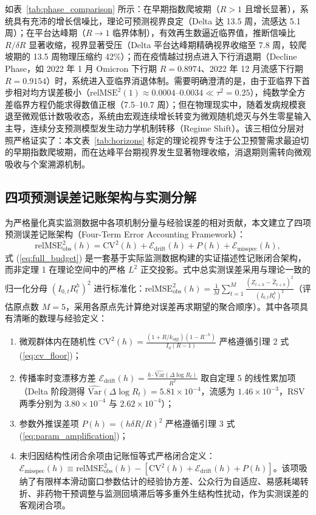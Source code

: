\documentclass[11pt,a4paper]{article}
\theoremstyle{plain}
\theoremstyle{definition}
\begin{document}
如表~\ref{tab:phase_comparison} 所示：在早期指数爬坡期（$R > 1$ 且增长显著），系统具有充沛的增长信噪比，理论可预测视界良定（Delta 达 13.5 周，流感达 5.1 周）；在平台达峰期（$R \to 1$ 临界体制），有效再生数逼近临界值，推断信噪比 $R/\delta R$ 显著收缩，视界显著受压（Delta 平台达峰期精确视界收缩至 7.8 周，较爬坡期的 13.5 周物理压缩约 42\%）；而在疫情越过拐点进入下行消退期（Decline Phase，如 2022 年 1 月 Omicron 下行期 $R=0.8974$、2022 年 12 月流感下行期 $R=0.9154$）时，系统进入亚临界消退体制。需要明确澄清的是，由于亚临界下首步相对均方误差极小（$\text{relMSE}^2(1) \approx 0.0004\text{--}0.0034 \ll \tau^2 = 0.25$），纯数学全方差临界方程仍能求得数值正根（7.5--10.7 周）；但在物理现实中，随着发病规模衰退至微观低计数吸收态，系统由宏观连续增长转变为微观随机熄灭与外生零星输入主导，连续分支预测模型发生动力学机制转移（Regime Shift）\citep{parag2026threshold}。该三相位分层对照严格证实了：本文表~\ref{tab:horizons} 标定的理论视界专注于公卫预警需求最迫切的早期指数爬坡期，而在达峰平台期视界发生显著物理收缩，消退期则需转向微观吸收与个案溯源机制。

\subsection{四项预测误差记账架构与实测分解}

为严格量化真实监测数据中各项机制分量与经验误差的相对贡献，本文建立了四项预测误差记账架构（Four-Term Error Accounting Framework）：
\begin{equation}
\text{relMSE}^2_{\text{obs}}(h) = \text{CV}^2(h) + \mathcal{E}_{\text{drift}}(h) + P(h) + \mathcal{E}_{\text{misspec}}(h),
\label{eq:full_budget}
\end{equation}
式 (\ref{eq:full_budget}) 是一套基于实际监测数据构建的实证描述性记账闭合架构，而非定理 1 在理论空间中的严格 $L^2$ 正交投影。式中总实测误差采用与理论一致的归一化分母 $(I_{0,t} R_t^h)^2$ 进行标准化：$\text{relMSE}^2_{\text{obs}}(h) = \frac{1}{M}\sum_{t=1}^M \frac{(Z_{t+h} - \hat{Z}_{t+h})^2}{(I_{0,t} R_t^h)^2}$（评估原点数 $M=5$，采用各原点先计算绝对误差再求期望的聚合顺序）。其中各项具有清晰的数理与经验定义：
\begin{enumerate}
\item 微观群体内在随机性 $\text{CV}^2(h) = \frac{(1+R/k_{\text{agg}})(1-R^{-h})}{I_0(R-1)}$ 严格遵循引理 2 式 (\ref{eq:cv_floor})；
\item 传播率时变漂移方差 $\mathcal{E}_{\text{drift}}(h) = \frac{h \cdot \widehat{\text{Var}}(\Delta \log R_t)}{R^2}$ 取自定理 5 的线性累加项（Delta 阶段测得 $\widehat{\text{Var}}(\Delta \log R_t) = 5.81 \times 10^{-4}$，流感为 $1.46 \times 10^{-3}$，RSV 两季分别为 $3.80 \times 10^{-4}$ 与 $2.62 \times 10^{-4}$）；
\item 参数外推误差项 $P(h) = (h \delta R / R)^2$ 严格遵循引理 3 式 (\ref{eq:param_amplification})；
\item 未归因结构性闭合余项由记账恒等式严格闭合定义：$\mathcal{E}_{\text{misspec}}(h) \equiv \text{relMSE}^2_{\text{obs}}(h) - [\text{CV}^2(h) + \mathcal{E}_{\text{drift}}(h) + P(h)]$。该项吸纳了有限样本滑动窗口参数估计的经验协方差、公众行为自适应、易感耗竭转折、非药物干预调整与监测回填滞后等多重外生结构性扰动，作为实测误差的客观闭合项。
\end{enumerate}
\end{document}
